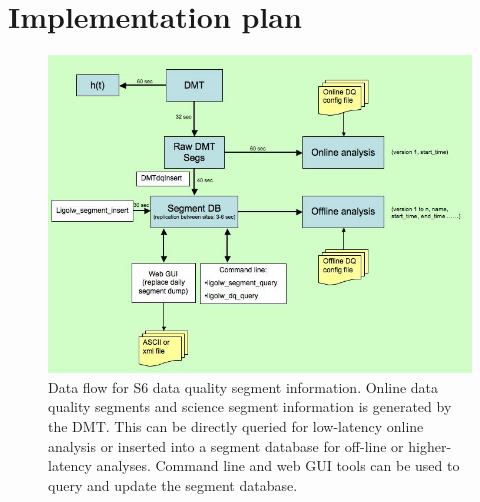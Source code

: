 \section{Implementation plan}
\begin{figure}[h]
  \begin{center}
    \includegraphics[width=0.9\linewidth]{figures/segdb/T0900005_fig1}
  \end{center}
  \caption{Data flow for S6 data quality segment information. Online data
  quality segments and science segment information is generated by the DMT.
  This can be directly queried for low-latency online analysis or inserted
  into a segment database for off-line or higher-latency analyses. Command
  line and web GUI  tools can be used to query and update the segment
  database.} 
\end{figure}

